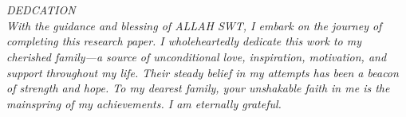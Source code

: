 \newenvironment{dedication}
{%
    \thispagestyle{empty}%
    \vspace*{\stretch{1}}%
    \itshape             %
    \centering        %
}
{\par %
    \vspace{\stretch{3}} %
    \clearpage           %
}

\section*{}
\begin{dedication}{DEDCATION}
    \\
    With the guidance and blessing of ALLAH SWT, I embark on the journey of
    completing this research paper. I wholeheartedly dedicate this work to my cherished
    family---a source of unconditional love, inspiration, motivation, and support
    throughout my life. Their steady belief in my attempts has been
    a beacon of strength and hope. To my dearest family, your unshakable faith in me
    is the mainspring of my achievements. I am eternally grateful.
\end{dedication}